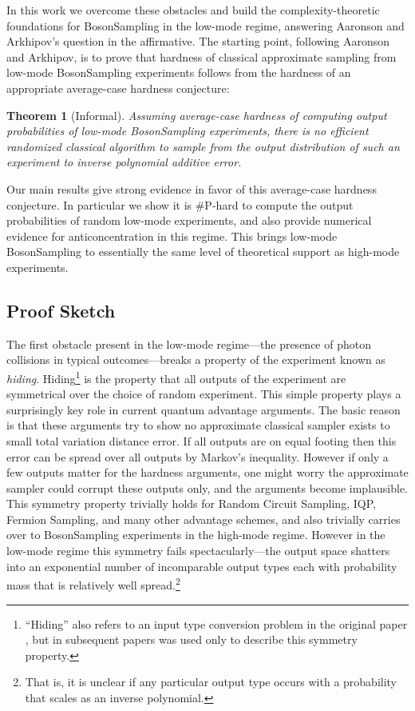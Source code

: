\documentclass[11pt]{article}
\theoremstyle{plain}
\theoremstyle{plain}
\theoremstyle{plain}
\newtheorem{thm}{Theorem}
\theoremstyle{plain}
\theoremstyle{plain}
\theoremstyle{plain}
\theoremstyle{plain}
\theoremstyle{remark}
\theoremstyle{remark}
\theoremstyle{plain}
\theoremstyle{plain}
\theoremstyle{plain}
\theoremstyle{plain}
\begin{document}
In this work we overcome these obstacles and build the complexity-theoretic foundations for BosonSampling in the low-mode regime, answering Aaronson and Arkhipov's question in the affirmative. The starting point, following Aaronson and Arkhipov, is to prove that hardness of classical approximate sampling from low-mode BosonSampling experiments follows from the hardness of an appropriate average-case hardness conjecture:

\begin{thm}[Informal] \label{thm:nosamplerinformal}
    Assuming average-case hardness of computing output probabilities of low-mode BosonSampling experiments, there is no efficient randomized classical algorithm to sample from the output distribution of such an experiment to inverse polynomial additive error.
\end{thm}

Our main results give strong evidence in favor of this average-case hardness conjecture. In particular we show it is \textsf{\#P}-hard to compute the output probabilities of random low-mode experiments, and also provide numerical evidence for anticoncentration in this regime. 
This brings low-mode BosonSampling to essentially the same level of theoretical support as high-mode experiments.

\vspace{-1em}
\subsection{Proof Sketch}

The first obstacle present in the low-mode regime---the presence of photon collisions in typical outcomes---breaks a property of the experiment known as \emph{hiding}. Hiding\footnote{``Hiding'' also refers to an input type conversion problem in the original paper \cite{Aaronson2013}, but in subsequent papers was used only to describe this symmetry property.} is the property that all outputs of the experiment are symmetrical over the choice of random experiment. This simple property plays a surprisingly key role in current quantum advantage arguments. The basic reason is that these arguments try to show no approximate classical sampler exists to small total variation distance error. If all outputs are on equal footing then this error can be spread over all outputs by Markov's inequality. However if only a few outputs matter for the hardness arguments, one might worry the approximate sampler could corrupt these outputs only, and the arguments become implausible. This symmetry property trivially holds for Random Circuit Sampling, IQP, Fermion Sampling, and many other advantage schemes, and also trivially carries over to BosonSampling experiments in the high-mode regime. However in the low-mode regime this symmetry fails spectacularly---the output space shatters into an exponential number of incomparable output types each with probability mass that is relatively well spread.\footnote{That is, it is unclear if any particular output type occurs with a probability that scales as an inverse polynomial.}
\end{document}
